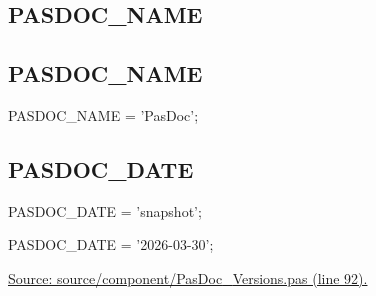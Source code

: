 \documentclass{report}
\newif\ifpdf
\begin{document}
\subsection*{\large{\textbf{PASDOC{\_}NAME}}\normalsize\hspace{1ex}\hrulefill}
\else
\subsection*{PASDOC{\_}NAME}
\fi
\label{PasDoc_Versions-PASDOC_NAME}
\begin{list}{}{
\setlength{\itemindent}{0cm}
\setlength{\listparindent}{0cm}
\setlength{\leftmargin}{\evensidemargin}
\addtolength{\leftmargin}{\tmplength}
\settowidth{\labelsep}{X}
\addtolength{\leftmargin}{\labelsep}
\setlength{\labelwidth}{\tmplength}
}
\item[\textbf{Declaration}\hfill]
\ifpdf
\begin{flushleft}
\fi
\begin{ttfamily}
PASDOC{\_}NAME = 'PasDoc';\end{ttfamily}

\ifpdf
\end{flushleft}
\fi

\end{list}
\ifpdf
\subsection*{\large{\textbf{PASDOC{\_}DATE}}\normalsize\hspace{1ex}\hrulefill}
\else
\subsection*{PASDOC{\_}DATE}
\fi
\label{PasDoc_Versions-PASDOC_DATE}
\begin{list}{}{
\setlength{\itemindent}{0cm}
\setlength{\listparindent}{0cm}
\setlength{\leftmargin}{\evensidemargin}
\addtolength{\leftmargin}{\tmplength}
\settowidth{\labelsep}{X}
\addtolength{\leftmargin}{\labelsep}
\setlength{\labelwidth}{\tmplength}
}
\item[\textbf{Declaration}\hfill]
\ifpdf
\begin{flushleft}
\fi
\begin{ttfamily}
PASDOC{\_}DATE = 'snapshot';\end{ttfamily}

\ifpdf
\end{flushleft}
\fi

\par
\item[\textbf{Description}]
PASDOC{\_}DATE = '2026{-}03{-}30';\par
\href{https://github.com/pasdoc/pasdoc/blob/master/source/component/PasDoc_Versions.pas#L92}{Source: source/component/PasDoc{\_}Versions.pas (line 92).}

\end{list}
\ifpdf
\end{document}
